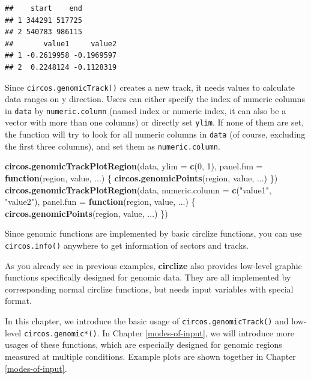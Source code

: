 \documentclass[]{book}
\newenvironment{Shaded}{\begin{snugshade}}{\end{snugshade}}
\newcommand{\KeywordTok}[1]{\textcolor[rgb]{0.13,0.29,0.53}{\textbf{#1}}}
\newcommand{\DataTypeTok}[1]{\textcolor[rgb]{0.13,0.29,0.53}{#1}}
\newcommand{\DecValTok}[1]{\textcolor[rgb]{0.00,0.00,0.81}{#1}}
\newcommand{\StringTok}[1]{\textcolor[rgb]{0.31,0.60,0.02}{#1}}
\newcommand{\ControlFlowTok}[1]{\textcolor[rgb]{0.13,0.29,0.53}{\textbf{#1}}}
\newcommand{\NormalTok}[1]{#1}
\theoremstyle{definition}
\theoremstyle{definition}
\theoremstyle{remark}
\begin{document}
\begin{verbatim}
##    start    end
## 1 344291 517725
## 2 540783 986115
##       value1     value2
## 1 -0.2619958 -0.1969597
## 2  0.2248124 -0.1128319
\end{verbatim}

Since \texttt{circos.genomicTrack()} creates a new track, it needs
values to calculate data ranges on y direction. Users can either specify
the index of numeric columns in \texttt{data} by \texttt{numeric.column}
(named index or numeric index, it can also be a vector with more than
one columns) or directly set \texttt{ylim}. If none of them are set, the
function will try to look for all numeric columns in \texttt{data} (of
course, excluding the first three columns), and set them as
\texttt{numeric.column}.

\begin{Shaded}
\begin{Highlighting}[]
\KeywordTok{circos.genomicTrackPlotRegion}\NormalTok{(data, }\DataTypeTok{ylim =} \KeywordTok{c}\NormalTok{(}\DecValTok{0}\NormalTok{, }\DecValTok{1}\NormalTok{),}
    \DataTypeTok{panel.fun =} \ControlFlowTok{function}\NormalTok{(region, value, ...) \{}
        \KeywordTok{circos.genomicPoints}\NormalTok{(region, value, ...)}
\NormalTok{\})}
\KeywordTok{circos.genomicTrackPlotRegion}\NormalTok{(data, }\DataTypeTok{numeric.column =} \KeywordTok{c}\NormalTok{(}\StringTok{"value1"}\NormalTok{, }\StringTok{"value2"}\NormalTok{), }
    \DataTypeTok{panel.fun =} \ControlFlowTok{function}\NormalTok{(region, value, ...) \{}
        \KeywordTok{circos.genomicPoints}\NormalTok{(region, value, ...)}
\NormalTok{\})}
\end{Highlighting}
\end{Shaded}

Since genomic functions are implemented by basic circlize functions, you
can use \texttt{circos.info()} anywhere to get information of sectors
and tracks.

As you already see in previous examples, \textbf{circlize} also provides
low-level graphic functions specifically designed for genomic data. They
are all implemented by corresponding normal circlize functions, but
needs input variables with special format.

In this chapter, we introduce the basic usage of
\texttt{circos.genomicTrack()} and low-level \texttt{circos.genomic*()}.
In Chapter \ref{modes-of-input}, we will introduce more usages of these
functions, which are especially designed for genomic regions measured at
multiple conditions. Example plots are shown together in Chapter
\ref{modes-of-input}.
\end{document}
